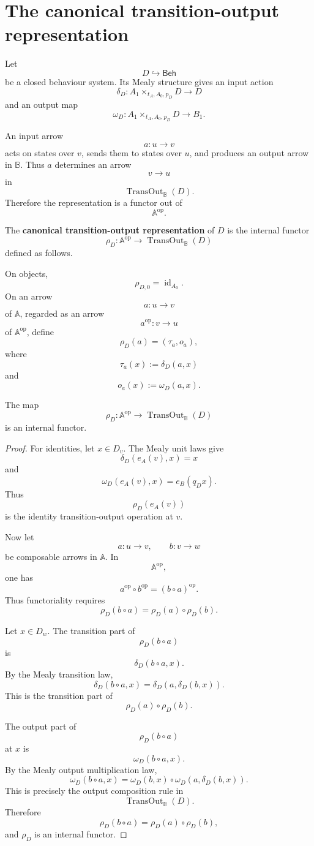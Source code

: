 \section{The canonical transition-output representation}
\label{sec:reiterman-canonical-transition-output-representation}

Let
\[
D\hookrightarrow\mathsf{Beh}
\]
be a closed behaviour system. Its Mealy structure gives an input action
\[
\delta_D:
A_1\times_{t_A,A_0,p_D}D\to D
\]
and an output map
\[
\omega_D:
A_1\times_{t_A,A_0,p_D}D\to B_1.
\]

An input arrow
\[
a:u\to v
\]
acts on states over \(v\), sends them to states over \(u\), and produces an
output arrow in \(\mathbb B\). Thus \(a\) determines an arrow
\[
v\to u
\]
in
\[
\operatorname{TransOut}_{\mathbb B}(D).
\]
Therefore the representation is a functor out of
\[
\mathbb A^{\mathrm{op}}.
\]

\begin{definition}
\label{def:reiterman-rho-D}
The \textbf{canonical transition-output representation} of \(D\) is the
internal functor
\[
\rho_D:
\mathbb A^{\mathrm{op}}
\to
\operatorname{TransOut}_{\mathbb B}(D)
\]
defined as follows.

On objects,
\[
\rho_{D,0}=\operatorname{id}_{A_0}.
\]
On an arrow
\[
a:u\to v
\]
of \(\mathbb A\), regarded as an arrow
\[
a^{\mathrm{op}}:v\to u
\]
of \(\mathbb A^{\mathrm{op}}\), define
\[
\rho_D(a)=(\tau_a,o_a),
\]
where
\[
\tau_a(x):=\delta_D(a,x)
\]
and
\[
o_a(x):=\omega_D(a,x).
\]
\end{definition}

\begin{proposition}
\label{prop:reiterman-rho-D-functor}
The map
\[
\rho_D:
\mathbb A^{\mathrm{op}}
\to
\operatorname{TransOut}_{\mathbb B}(D)
\]
is an internal functor.
\end{proposition}

\begin{proof}
For identities, let \(x\in D_v\). The Mealy unit laws give
\[
\delta_D(e_A(v),x)=x
\]
and
\[
\omega_D(e_A(v),x)=e_B(q_Dx).
\]
Thus
\[
\rho_D(e_A(v))
\]
is the identity transition-output operation at \(v\).

Now let
\[
a:u\to v,
\qquad
b:v\to w
\]
be composable arrows in \(\mathbb A\). In
\[
\mathbb A^{\mathrm{op}},
\]
one has
\[
a^{\mathrm{op}}\circ b^{\mathrm{op}}
=
(b\circ a)^{\mathrm{op}}.
\]
Thus functoriality requires
\[
\rho_D(b\circ a)
=
\rho_D(a)\circ\rho_D(b).
\]

Let \(x\in D_w\). The transition part of
\[
\rho_D(b\circ a)
\]
is
\[
\delta_D(b\circ a,x).
\]
By the Mealy transition law,
\[
\delta_D(b\circ a,x)
=
\delta_D(a,\delta_D(b,x)).
\]
This is the transition part of
\[
\rho_D(a)\circ\rho_D(b).
\]

The output part of
\[
\rho_D(b\circ a)
\]
at \(x\) is
\[
\omega_D(b\circ a,x).
\]
By the Mealy output multiplication law,
\[
\omega_D(b\circ a,x)
=
\omega_D(b,x)\circ
\omega_D(a,\delta_D(b,x)).
\]
This is precisely the output composition rule in
\[
\operatorname{TransOut}_{\mathbb B}(D).
\]
Therefore
\[
\rho_D(b\circ a)=\rho_D(a)\circ\rho_D(b),
\]
and \(\rho_D\) is an internal functor.
\end{proof}

